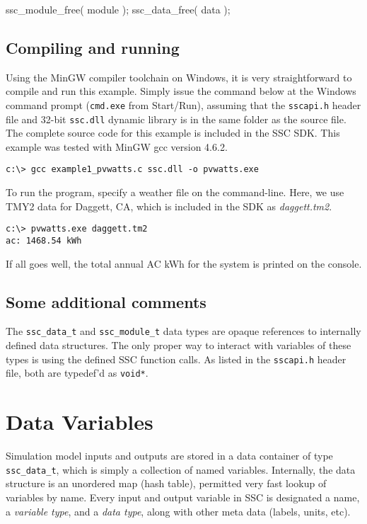 \documentclass{article}
\begin{document}
\begin{verbatimtab}	
	ssc_module_free( module );
	ssc_data_free( data );
\end{verbatimtab}

\subsection{Compiling and running}

Using the MinGW compiler toolchain on Windows, it is very straightforward to compile and run this example.  Simply issue the command below at the Windows command prompt (\texttt{cmd.exe} from Start/Run), assuming that the \texttt{sscapi.h} header file and 32-bit \texttt{ssc.dll} dynamic library is in the same folder as the source file.  The complete source code for this example is included in the SSC SDK.  This example was tested with MinGW gcc version 4.6.2.

\begin{verbatim}
c:\> gcc example1_pvwatts.c ssc.dll -o pvwatts.exe
\end{verbatim}

To run the program, specify a weather file on the command-line.  Here, we use TMY2 data for Daggett, CA, which is included in the SDK as \emph{daggett.tm2}.

\begin{verbatim}
c:\> pvwatts.exe daggett.tm2
ac: 1468.54 kWh
\end{verbatim}

If all goes well, the total annual AC kWh for the system is printed on the console.

\subsection{Some additional comments}

The \texttt{ssc\_data\_t} and \texttt{ssc\_module\_t} data types are opaque references to internally defined data structures.  The only proper way to interact with variables of these types is using the defined SSC function calls.  As listed in the \texttt{sscapi.h} header file, both are typedef'd as \texttt{void*}.


\section{Data Variables}
\label{sec_variables}

Simulation model inputs and outputs are stored in a data container of type \texttt{ssc\_data\_t}, which is simply a collection of named variables.  Internally, the data structure is an unordered map (hash table), permitted very fast lookup of variables by name.  Every input and output variable in SSC is designated a name, a \emph{variable type}, and a \emph{data type}, along with other meta data (labels, units, etc). 
\end{document}
